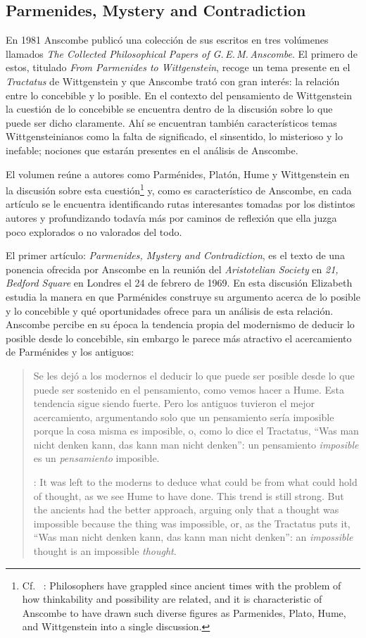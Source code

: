 \subsection{Parmenides, Mystery and Contradiction}

En 1981 Anscombe publicó una colección de sus escritos en tres volúmenes
llamados \emph{The Collected Philosophical Papers of G.\,E.\,M.\,Anscombe}. El
primero de estos, titulado \emph{From Parmenides to Wittgenstein}, recoge un tema
presente en el \emph{Tractatus} de Wittgenstein y que Anscombe trató con gran
interés: la relación entre lo concebible y lo posible. En el contexto del
pensamiento de Wittgenstein la cuestión de lo concebible se encuentra dentro de
la discusión sobre lo que puede ser dicho claramente. Ahí se encuentran también
característicos temas Wittgensteinianos como la falta de significado, el
sinsentido, lo misterioso y lo inefable; nociones que estarán presentes en el
análisis de Anscombe.

El volumen reúne a autores como Parménides, Platón, Hume y Wittgenstein en la
discusión sobre esta cuestión\footnote{Cf.~ \cite[193]{teichmann2008ans}:
  Philosophers have grappled since ancient times with the problem of how
  thinkability and possibility are related, and it is characteristic of Anscombe
  to have drawn such diverse figures as Parmenides, Plato, Hume, and
  Wittgenstein into a single discussion.} y, como es característico de
Anscombe, en cada artículo se le encuentra identificando rutas interesantes
tomadas por los distintos autores y profundizando todavía más por caminos de
reflexión que ella juzga poco explorados o no valorados del todo.

El primer artículo: \emph{Parmenides, Mystery and Contradiction}, es el texto de
una ponencia ofrecida por Anscombe en la reunión del \emph{Aristotelian Society}
en \emph{21, Bedford Square} en Londres el 24 de febrero de 1969. En esta
discusión Elizabeth estudia la manera en que Parménides construye su argumento
acerca de lo posible y lo concebible y qué oportunidades ofrece para un análisis
de esta relación. Anscombe percibe en su época la tendencia propia del
modernismo de deducir lo posible desde lo concebible, sin embargo le parece más
atractivo el acercamiento de Parménides y los antiguos:
\blockquote[{\cite[xi]{anscombe1981parmenides}}: It was left to the moderns to
deduce what could be from what could hold of thought, as we see Hume to have
done. This trend is still strong. But the ancients had the better approach,
arguing only that a thought was impossible because the thing was impossible, or,
as the Tractatus puts it, ``Was man nicht denken kann, das kann man nicht
denken'': an \emph{impossible} thought is an impossible \emph{thought}.]{Se les
  dejó a los modernos el deducir lo que puede ser posible desde lo que puede ser
  sostenido en el pensamiento, como vemos hacer a Hume. Esta tendencia sigue
  siendo fuerte. Pero los antiguos tuvieron el mejor acercamiento, argumentando
  solo que un pensamiento sería imposible porque la cosa misma es imposible, o,
  como lo dice el Tractatus, ``Was man nicht denken kann, das kann man nicht
  denken'': un pensamiento \emph{imposible} es un \emph{pensamiento} imposible.}


